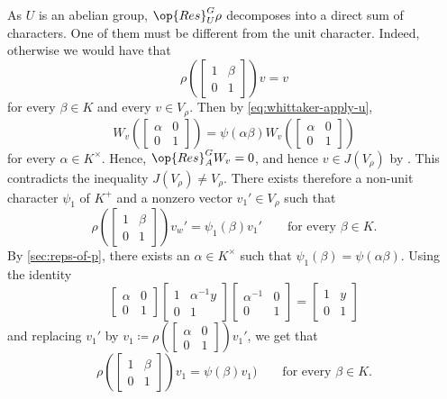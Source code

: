 \documentclass[../main.tex]{subfiles}
\begin{document}
As $U$ is an abelian group, $\op{Res}^G_U\rho$ decomposes into a direct sum of characters. One of them must be different from the unit character. Indeed, otherwise we would have that
\[\rho\left(\begin{bmatrix}
	1 & \beta \\
	0 & 1
\end{bmatrix}\right)v=v\]
for every $\beta\in K$ and every $v\in V_\rho$. Then by \eqref{eq:whittaker-apply-u},
\[W_v\left(\begin{bmatrix}
	\alpha & 0 \\
	0 & 1
\end{bmatrix}\right)=\psi(\alpha\beta)W_v\left(\begin{bmatrix}
	\alpha & 0 \\
	0 & 1
\end{bmatrix}\right)\]
for every $\alpha\in K^\times$. Hence, $\op{Res}^G_AW_v=0$, and hence $v\in J(V_\rho)$ by . This contradicts the inequality $J(V_\rho)\ne V_\rho$. There exists therefore a non-unit character $\psi_1$ of $K^+$ and a nonzero vector $v_1'\in V_\rho$ such that
\[\rho\left(\begin{bmatrix}
	1 & \beta \\
	0 & 1
\end{bmatrix}\right)v_w'=\psi_1(\beta)v_1'\qquad\text{for every }\beta\in K.\]
By \cref{sec:reps-of-p}, there exists an $\alpha\in K^\times$ such that $\psi_1(\beta)=\psi(\alpha\beta)$. Using the identity
\[\begin{bmatrix}
	\alpha & 0 \\
	0 & 1
\end{bmatrix}\begin{bmatrix}
	1 & \alpha^{-1}y \\
	0 & 1
\end{bmatrix}\begin{bmatrix}
	\alpha^{-1} & 0 \\
	0 & 1
\end{bmatrix}=\begin{bmatrix}
	1 & y \\
	0 & 1
\end{bmatrix}\]
and replacing $v_1'$ by $v_1\coloneqq\rho\left(\begin{bmatrix}
	\alpha & 0 \\
	0 & 1
\end{bmatrix}\right)v_1'$, we get that
\begin{equation}
	\rho\left(\begin{bmatrix}
		1 & \beta \\
		0 & 1
	\end{bmatrix}\right)v_1=\psi(\beta)v_1)\qquad\text{for every }\beta\in K. \label{eq:v1-is-psi-eigen}
\end{equation}
\end{document}
